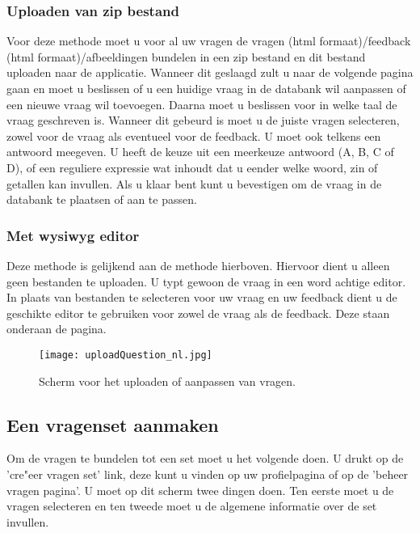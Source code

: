 \documentclass[11pt,a4paper]{report}
\begin{document}
\subsubsection{Uploaden van zip bestand}
Voor deze methode moet u voor al uw vragen de vragen (html formaat)/feedback (html formaat)/afbeeldingen bundelen in een zip bestand en dit bestand uploaden naar de applicatie. Wanneer dit geslaagd zult u naar de volgende pagina gaan en moet u beslissen of u een huidige vraag in de databank wil aanpassen of een nieuwe vraag wil toevoegen. Daarna moet u beslissen voor in welke taal de vraag geschreven is. Wanneer dit gebeurd is moet u de juiste vragen selecteren, zowel voor de vraag als eventueel voor de feedback. U moet ook telkens een antwoord meegeven. U heeft de keuze uit een meerkeuze antwoord (A, B, C of D), of een reguliere expressie wat inhoudt dat u eender welke woord, zin of getallen kan invullen. Als u klaar bent kunt u bevestigen om de vraag in de databank te plaatsen of aan te passen.
\subsubsection{Met wysiwyg editor}
Deze methode is gelijkend aan de methode hierboven. Hiervoor dient u alleen geen bestanden te uploaden. U typt gewoon de vraag in een word achtige editor. In plaats van bestanden te selecteren voor uw vraag en uw feedback dient u de geschikte editor te gebruiken voor zowel de vraag als de feedback. Deze staan onderaan de pagina. 
\begin{figure}[h!]
\centering
\texttt{[image: uploadQuestion\_nl.jpg]}
\caption{Scherm voor het uploaden of aanpassen van vragen.}
\label{fig:uploadQuestion}
\end{figure}


\subsection{Een vragenset aanmaken}
Om de vragen te bundelen tot een set moet u het volgende doen. U drukt op de 'cre"eer vragen set' link, deze kunt u vinden op uw profielpagina of op de 'beheer vragen pagina'. U moet op dit scherm twee dingen doen. Ten eerste moet u de vragen selecteren en ten tweede moet u de algemene informatie over de set invullen. 
\end{document}
